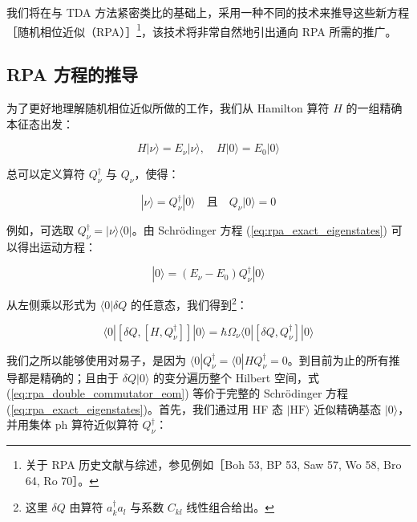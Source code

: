 我们将在与 TDA 方法紧密类比的基础上，采用一种不同的技术来推导这些新方程［随机相位近似（RPA）］\footnote{关于 RPA 历史文献与综述，参见例如［Boh 53, BP 53, Saw 57, Wo 58, Bro 64, Ro 70］。}，该技术将非常自然地引出通向
RPA 所需的推广。

\subsection{RPA 方程的推导\label{subsec:8.4.1_RPA=0065B9=007A0B=007684=0063A8=005BFC}}

为了更好地理解随机相位近似所做的工作，我们从 Hamilton 算符 $H$ 的一组精确本征态出发：

\begin{equation}
H|\nu\rangle=E_{\nu}|\nu\rangle,\quad H|0\rangle=E_{0}|0\rangle\label{eq:rpa_exact_eigenstates}
\end{equation}

总可以定义算符 $Q^{\dagger}_{\nu}$ 与 $Q_{\nu}$，使得：

\begin{equation}
|\nu\rangle=Q^{\dagger}_{\nu}|0\rangle\quad\text{且}\quad Q_{\nu}|0\rangle=0\label{eq:rpa_phonon_operators_def}
\end{equation}

例如，可选取 $Q^{\dagger}_{\nu}=|\nu\rangle\langle0|$。由 Schrödinger 方程
(\ref{eq:rpa_exact_eigenstates}) 可以得出运动方程：

\begin{equation}
[H,Q^{\dagger}_{\nu}]|0\rangle=(E_{\nu}-E_{0})Q^{\dagger}_{\nu}|0\rangle\label{eq:rpa_equation_of_motion}
\end{equation}

从左侧乘以形式为 $\langle0|\delta Q$ 的任意态，我们得到\footnote{这里 $\delta Q$ 由算符 $a^{\dagger}_{k}a_{l}$ 与系数 $C_{kl}$ 线性组合给出。}：

\begin{equation}
\langle0|[\delta Q,[H,Q^{\dagger}_{\nu}]]|0\rangle=\hbar\Omega_{\nu}\langle0|[\delta Q,Q^{\dagger}_{\nu}]|0\rangle\label{eq:rpa_double_commutator_eom}
\end{equation}

我们之所以能够使用对易子，是因为 $\langle0|Q^{\dagger}_{\nu}=\langle0|HQ^{\dagger}_{\nu}=0$。到目前为止的所有推导都是精确的；且由于
$\delta Q|0\rangle$ 的变分遍历整个 Hilbert 空间，式 (\ref{eq:rpa_double_commutator_eom})
等价于完整的 Schrödinger 方程 (\ref{eq:rpa_exact_eigenstates})。首先，我们通过用 HF
态 $|\text{HF}\rangle$ 近似精确基态 $|0\rangle$，并用集体 ph 算符近似算符 $Q^{\dagger}_{\nu}$：

